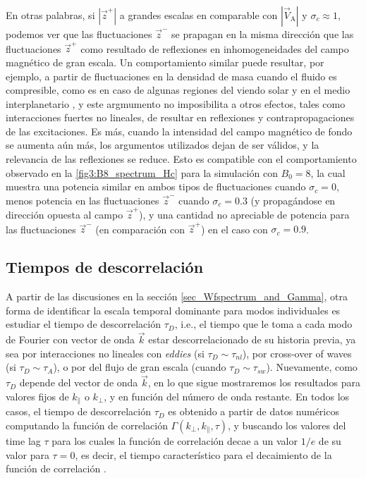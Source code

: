 En otras palabras, si $|\vec{z}^+|$ a grandes escalas en comparable
con $|\vec{V}_\textrm{A}|$ y $\sigma_c \approx 1$, podemos ver que las
fluctuaciones $\vec{z}^-$ se prapagan en la misma dirección que las
fluctuaciones $\vec{z}^+$ como resultado de reflexiones en
inhomogeneidades del campo magnético de gran escala.  Un
comportamiento similar puede resultar, por ejemplo, a partir de
fluctuaciones en la densidad de masa cuando el fluido es compresible,
como es en caso de algunas regiones del viendo solar y en el medio
interplanetario \cite{zhou_1989_nonWKBevolution}, y este argmumento no
imposibilita a otros efectos, tales como interacciones fuertes no
lineales, de resultar en reflexiones y contrapropagaciones de las
excitaciones. Es más, cuando la intensidad del campo magnético de
fondo se aumenta aún más, los argumentos utilizados dejan de ser
válidos, y la relevancia de las reflexiones se reduce. Esto es
compatible con el comportamiento observado en la
\cref{fig3:B8_spectrum_Hc} para la simulación con $B_0=8$, la cual
muestra una potencia similar en ambos tipos de fluctuaciones cuando
$\sigma_c=0$, menos potencia en las fluctuaciones $\vec{z}^-$ cuando
$\sigma_c=0.3$ (y propagándose en dirección opuesta al campo
$\vec{z}^+$), y una cantidad no apreciable de potencia para las
fluctuaciones $\vec{z}^-$ (en comparación con $\vec{z}^+$) en el caso
con $\sigma_c=0.9$.

\subsection{Tiempos de descorrelación}

A partir de las discusiones en la sección
\ref{sec_Wfspectrum_and_Gamma}, otra forma de identificar la escala
temporal dominante para modos individuales es estudiar el tiempo de
descorrelación $\tau_D$, i.e., el tiempo que le toma a cada modo de
Fourier con vector de onda $\vec{k}$ estar descorrelacionado de su
historia previa, ya sea por interacciones no lineales con
\textit{eddies} (si $\tau_D \sim \tau_{nl}$), por {\color{red}
  cross-over of waves} (si $\tau_D \sim \tau_A$), o por \sweeping del
flujo de gran escala (cuando $\tau_D \sim \tau_{sw}$). Nuevamente,
como $\tau_D$ depende del vector de onda $\vec{k}$, en lo que sigue
mostraremos los resultados para valores fijos de $k_\parallel$ o
$k_\perp$, y en función del número de onda restante. En todos los
casos, el tiempo de descorrelación $\tau_D$ es obtenido a partir de
datos numéricos computando la función de correlación
$\Gamma(k_{\perp},k_{\parallel},\tau)$, y buscando los valores del
{\color{red} time lag} $\tau$ para los cuales la función de
correlación decae a un valor $1/e$ de su valor para $\tau=0$, es
decir, el tiempo característico para el decaimiento de la función de
correlación \cite{lugones_2016_spatiotemporal}.

